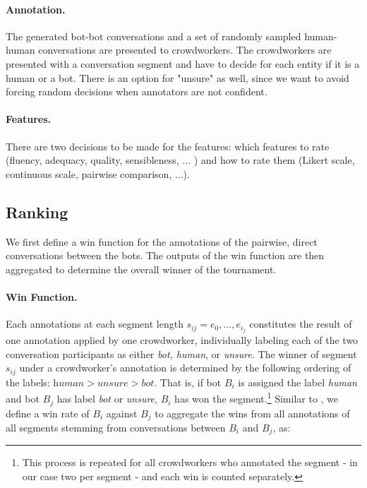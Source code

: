 \documentclass[11pt,a4paper]{article}
\begin{document}
\paragraph{Annotation.} The generated bot-bot conversations and a set of randomly sampled human-human conversations are presented to crowdworkers. The crowdworkers are presented with a conversation segment and have to decide for each entity if it is a human or a bot. There is an option for "unsure" as well, since we want to avoid forcing random decisions when annotators are not confident.%
\paragraph{Features.} There are two decisions to be made for the features: which features to rate (fluency, adequacy, quality, sensibleness, ... ) and how to rate them (Likert scale, continuous scale, pairwise comparison, ...).

\subsection{Ranking}

We first define a win function for the annotations of the pairwise, direct conversations between the bots. The outputs of the win function are then aggregated to determine the overall winner of the tournament.

\paragraph{Win Function.}

Each annotations at each segment length $s_{ij} = e_0, ... , e_{i_j}$ constitutes the result of one annotation applied by one crowdworker, individually labeling each of the two conversation participants as either \textit{bot, human}, or \textit{unsure}. The winner of segment $s_{ij}$ under a crowdworker's annotation is determined by the following ordering of the labels: $\textit{human} >  \textit{unsure} > \textit{bot}$. That is, if bot $B_i$ is assigned the label \textit{human} and bot $B_j$ has label \textit{bot} or \textit{unsure}, $B_i$ has won the segment.\footnote{This process is repeated for all crowdworkers who annotated the segment - in our case two per segment - and each win is counted separately.} Similar to ,  we define a win rate of $B_i$ against $B_j$ to aggregate the wins from all annotations of all segments stemming from conversations between $B_i$ and $B_j$, as: 
\end{document}
